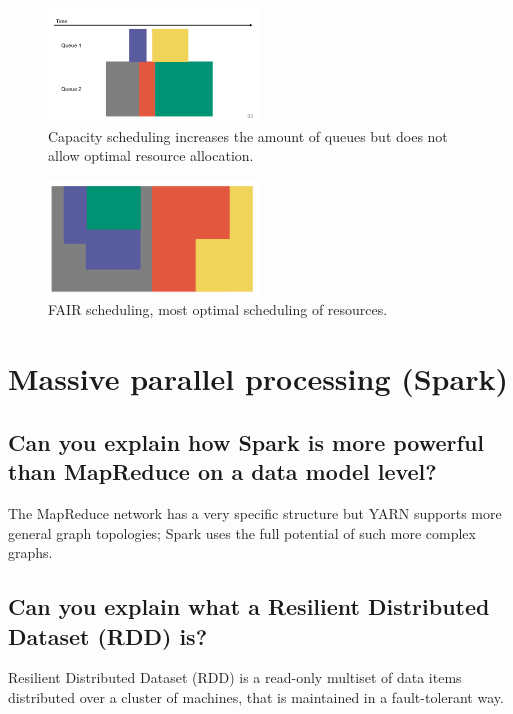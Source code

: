 \documentclass{article}
\begin{document}
\begin{figure}
  \centering
  \includegraphics[width=0.5\textwidth]{img/capacity_scheduling.png}
  \caption{Capacity scheduling increases the amount of queues but does not allow optimal resource allocation.}
  \label{fig:capsched}
\end{figure}

\begin{figure}
  \centering
  \includegraphics[width=0.5\textwidth]{img/fair.png}
  \caption{FAIR scheduling, most optimal scheduling of resources.}
  \label{fig:fairsched}
\end{figure}



\section{Massive parallel processing (Spark)}
\subsection{Can you explain how Spark is more powerful than MapReduce on a data model level?}

The MapReduce network has a very specific structure but YARN supports more general graph topologies; Spark uses the full potential of such more complex graphs. 

\subsection{Can you explain what a Resilient Distributed Dataset (RDD) is?}

Resilient Distributed Dataset (RDD) is a read-only multiset of data items distributed over a cluster of machines, that is maintained in a fault-tolerant way.
\end{document}

